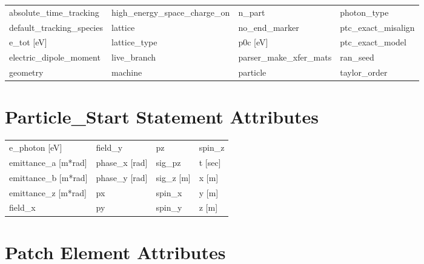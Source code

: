  \begin{tabular}{llll} \toprule
absolute_time_tracking           & high_energy_space_charge_on      & n_part                           & photon_type                      \\
default_tracking_species         & lattice                          & no_end_marker                    & ptc_exact_misalign               \\
e_tot [eV]                       & lattice_type                     & p0c [eV]                         & ptc_exact_model                  \\
electric_dipole_moment           & live_branch                      & parser_make_xfer_mats            & ran_seed                         \\
geometry                         & machine                          & particle                         & taylor_order                     \\
 \bottomrule
 \end{tabular}
 \vfill
 
 \section{Particle_Start Statement Attributes}
 \label{s:list.particle.start}
 
 \begin{tabular}{llll} \toprule
e_photon [eV]                    & field_y                          & pz                               & spin_z                           \\
emittance_a [m*rad]              & phase_x [rad]                    & sig_pz                           & t [sec]                          \\
emittance_b [m*rad]              & phase_y [rad]                    & sig_z [m]                        & x [m]                            \\
emittance_z [m*rad]              & px                               & spin_x                           & y [m]                            \\
field_x                          & py                               & spin_y                           & z [m]                            \\
 \bottomrule
 \end{tabular}
 \vfill
 
 \section{Patch Element Attributes}
 \label{s:list.patch}
 
